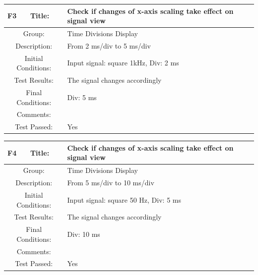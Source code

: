 \documentclass[12pt]{article}
\begin{document}
		\begin{table}[H]
	\begin{center}
		\begin{tabular}{| m{2cm}|m{2cm}|m{12cm}|}
			\hline 
			\bf F3&\bf Title:&\bf Check if changes of x-axis scaling take effect on signal view\\ 
			\hline 
			\multicolumn{2}{|c|}{Group:}&Time Divisions Display\\ 
			\hline 
			\multicolumn{2}{|c|}{Description:}&From 2 ms/div to 5 ms/div\\ 
			\hline 
			\multicolumn{2}{|c|}{Initial Conditions:}&Input signal: square 1kHz, Div: 2 ms\\ 
			\hline 
			\multicolumn{2}{|c|}{Test Results:}&The signal changes accordingly\\ 
			\hline 
			\multicolumn{2}{|c|}{Final Conditions:}&Div: 5 ms\\ 
			\hline 
			\multicolumn{2}{|c|}{Comments:}&\\ 
			\hline 
			\multicolumn{2}{|c|}{Test Passed:}&Yes \\ 
			\hline 
		\end{tabular} 
	\end{center}
\end{table}	
		\begin{table}[H]
	\begin{center}
		\begin{tabular}{| m{2cm}|m{2cm}|m{12cm}|}
			\hline 
			\bf F4&\bf Title:&\bf Check if changes of x-axis scaling take effect on signal view\\ 
			\hline 
			\multicolumn{2}{|c|}{Group:}&Time Divisions Display\\ 
			\hline 
			\multicolumn{2}{|c|}{Description:}&From 5 ms/div to 10 ms/div\\ 
			\hline 
			\multicolumn{2}{|c|}{Initial Conditions:}&Input signal: square 50 Hz, Div: 5 ms\\ 
			\hline 
			\multicolumn{2}{|c|}{Test Results:}&The signal changes accordingly\\ 
			\hline 
			\multicolumn{2}{|c|}{Final Conditions:}&Div: 10 ms \\ 
			\hline 
			\multicolumn{2}{|c|}{Comments:}&\\ 
			\hline 
			\multicolumn{2}{|c|}{Test Passed:}&Yes \\ 
			\hline 
		\end{tabular} 
	\end{center}
\end{table}	
\end{document}
